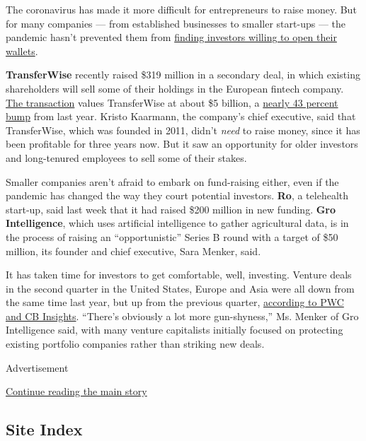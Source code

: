 The coronavirus has made it more difficult for entrepreneurs to raise
money. But for many companies --- from established businesses to smaller
start-ups --- the pandemic hasn't prevented them from
\href{https://www.nytimes3xbfgragh.onion/2020/08/03/business/dealbook/tiktok-microsoft-takeover.html}{finding
investors willing to open their wallets}.

\textbf{TransferWise} recently raised \$319 million in a secondary deal,
in which existing shareholders will sell some of their holdings in the
European fintech company.
\href{https://techcrunch.com/2020/07/28/transferwise-five-unicorns/}{The
transaction} values TransferWise at about \$5 billion, a
\href{https://www.forbes.com/sites/samshead/2019/05/22/transferwise-valued-at-35-billion-as-founders-sell-stake/}{nearly
43 percent bump} from last year. Kristo Kaarmann, the company's chief
executive, said that TransferWise, which was founded in 2011, didn't
\emph{need} to raise money, since it has been profitable for three years
now. But it saw an opportunity for older investors and long-tenured
employees to sell some of their stakes.

Smaller companies aren't afraid to embark on fund-raising either, even
if the pandemic has changed the way they court potential investors.
\textbf{Ro}, a telehealth start-up, said last week that it had raised
\$200 million in new funding. \textbf{Gro Intelligence}, which uses
artificial intelligence to gather agricultural data, is in the process
of raising an ``opportunistic'' Series B round with a target of \$50
million, its founder and chief executive, Sara Menker, said.

It has taken time for investors to get comfortable, well, investing.
Venture deals in the second quarter in the United States, Europe and
Asia were all down from the same time last year, but up from the
previous quarter,
\href{https://t.yesware.com/tt/e001b3127892bff3127c5684106b4fface2be613/6d096e53b8a44a013ebee1131ad0c628/67276689dfad2ab3eddda9aeeb223346/www.cbinsights.com/research/report/venture-capital-q2-2020/}{according
to PWC and CB Insights}. ``There's obviously a lot more gun-shyness,''
Ms. Menker of Gro Intelligence said, with many venture capitalists
initially focused on protecting existing portfolio companies rather than
striking new deals.

Advertisement

\protect\hyperlink{after-bottom}{Continue reading the main story}

\hypertarget{site-index}{%
\subsection{Site Index}\label{site-index}}

